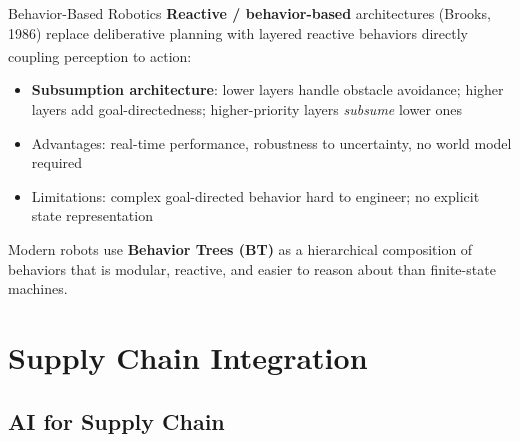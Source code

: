 \begin{v3topic}{Behavior-Based Robotics}
    \textbf{Reactive / behavior-based} architectures (Brooks, 1986) replace deliberative planning with layered reactive behaviors directly coupling perception to action\textsuperscript{\cite[][pp.~120--130]{benariElementsRobotics2017}}:
    \begin{itemize}
        \item \textbf{Subsumption architecture}: lower layers handle obstacle avoidance; higher layers add goal-directedness; higher-priority layers \emph{subsume} lower ones
        \item Advantages: real-time performance, robustness to uncertainty, no world model required
        \item Limitations: complex goal-directed behavior hard to engineer; no explicit state representation
    \end{itemize}
    Modern robots use \textbf{Behavior Trees (BT)} as a hierarchical composition of behaviors that is modular, reactive, and easier to reason about than finite-state machines.
\end{v3topic}

\section{Supply Chain Integration}

\subsection{AI for Supply Chain}

